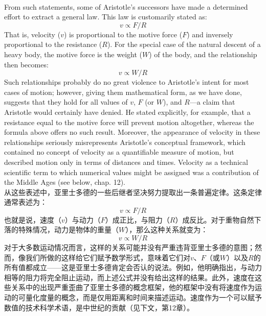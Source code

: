 \documentclass{article}
\begin{document}
\\
From such statements, some of Aristotle’s successors have made a determined effort to extract a general law. This law is customarily stated as:
\[v\propto F/R\]
That is, velocity ($v$) is proportional to the motive force ($F$) and inversely proportional to the resistance ($R$). For the special case of the natural descent of a heavy body, the motive force is the weight ($W$) of the body, and the relationship then becomes:
\[v\propto W/R\]
Such relationships probably do no great violence to Aristotle’s intent for most cases of motion; however, giving them mathematical form, as we have done, suggests that they hold for all values of $v$, $F$ (or $W$), and $R$—a claim that Aristotle would certainly have denied. He stated explicitly, for example, that a resistance equal to the motive force will prevent motion altogether, whereas the formula above offers no such result. Moreover, the appearance of velocity in these relationships seriously misrepresents Aristotle’s conceptual framework, which contained no concept of velocity as a quantifiable measure of motion, but described motion only in terms of distances and times. Velocity as a technical scientific term to which numerical values might be assigned was a contribution of the Middle Ages (see below, chap. 12).\\
从这些表述中，亚里士多德的一些后继者坚决努力提取出一条普遍定律。这条定律通常表述为：
\[v\propto F/R\]
也就是说，速度（$v$）与动力（$F$）成正比，与阻力（$R$）成反比。对于重物自然下落的特殊情况，动力是物体的重量（$W$），那么这种关系就变为：
\[v\propto W/R\]
对于大多数运动情况而言，这样的关系可能并没有严重违背亚里士多德的意图；然而，像我们所做的这样给它们赋予数学形式，意味着它们对$v$、$F$（或$W$）以及$R$的所有值都成立——这是亚里士多德肯定会否认的说法。例如，他明确指出，与动力相等的阻力将完全阻止运动，而上述公式并没有给出这样的结果。此外，速度在这些关系中的出现严重歪曲了亚里士多德的概念框架，他的框架中没有将速度作为运动的可量化度量的概念，而是仅用距离和时间来描述运动。速度作为一个可以赋予数值的技术科学术语，是中世纪的贡献（见下文，第12章）。\\
\end{document}
